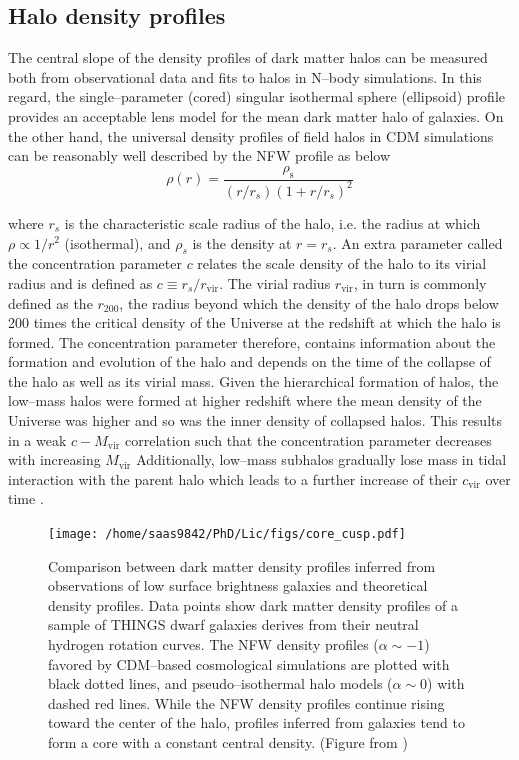 \documentclass[a4wide,12pt]{book}
\newcommand{\ignore}[1]{}
\begin{document}
\subsection*{Halo density profiles}
The central slope of the density profiles of dark matter halos can be measured both from observational data and fits to halos in N--body simulations. In this regard, the single--parameter (cored) singular isothermal sphere (ellipsoid) profile provides an acceptable lens model for the mean dark matter halo of galaxies. On the other hand, the universal density profiles of field halos in CDM simulations can be reasonably well described by the NFW profile as below
\begin{equation}
\label{eq:NFW}
\rho(r)=\frac{\rho_\mathrm{s}}{(r/r_s)(1+r/r_s)^{2}}
\end{equation}

where $r_s$ is the characteristic scale radius of the halo, i.e. the radius at which $\rho \propto 1/r^2$ (isothermal), and $\rho_s$ is the density at $r=r_s$. An extra parameter called the concentration parameter $c$ relates the scale density of the halo to its virial radius and is defined as $c\equiv r_s/r_\mathrm{vir}$. The virial radius $r_\mathrm{vir}$, in turn is commonly defined as the $r_{200}$, the radius beyond which the density of the halo drops below 200 times the critical density of the Universe at the redshift at which the halo is formed\ignore{ (more on this in section \ref{subsec:issues or systematic challenge})}. The concentration parameter therefore, contains information about the formation and evolution of the halo and depends on the time of the collapse of the halo as well as its virial mass. Given the hierarchical formation of halos, the low--mass halos were formed at higher redshift where the mean density of the Universe was higher and so was the inner density of collapsed halos. This results in a weak $c-M_\mathrm{vir}$ correlation such that the concentration parameter decreases with increasing $M_\mathrm{vir}$
  Additionally, low--mass subhalos gradually lose mass in tidal interaction with the parent halo which leads to a further increase of their $c_\mathrm{vir}$ over time \citep{Bullock+2001, Maccio+2008}.

\begin{figure}

\centering
\texttt{[image: /home/saas9842/PhD/Lic/figs/core\_cusp.pdf]} %
\caption{Comparison between dark matter density profiles inferred from observations of low surface brightness galaxies and theoretical density profiles. Data points show dark matter density profiles of a sample of THINGS dwarf galaxies derives from their neutral hydrogen rotation curves. The NFW density profiles ($\alpha\sim -1$) favored by CDM--based cosmological simulations are plotted with black dotted lines, and pseudo--isothermal halo models ($\alpha\sim 0$) with dashed red lines. While the NFW density profiles continue rising toward the center of the halo, profiles inferred from galaxies tend to form a core with a constant central density. (Figure from \citealt[][]{Oh+2011})}
\label{fig:core_cusp}
\end{figure}
\end{document}

